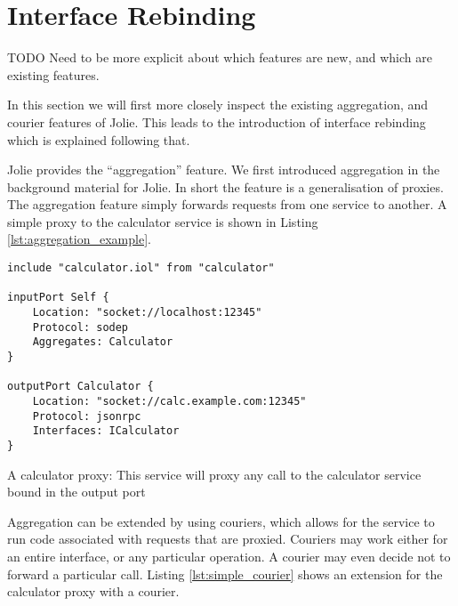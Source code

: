 \section{Interface Rebinding}
\label{sec:interface_rebinding}

TODO Need to be more explicit about which features are new, and which are
existing features.

In this section we will first more closely inspect the existing aggregation,
   and courier features of Jolie. This leads to the introduction of interface
   rebinding which is explained following that.

Jolie provides the ``aggregation'' feature. We first introduced aggregation in
the background material for Jolie. In short the feature is a generalisation of
proxies. The aggregation feature simply forwards requests from one service to
another. A simple proxy to the calculator service is shown in Listing
\ref{lst:aggregation_example}.

\begin{listing}[H]
\begin{verbatim}
include "calculator.iol" from "calculator"

inputPort Self {
    Location: "socket://localhost:12345"
    Protocol: sodep
    Aggregates: Calculator
}

outputPort Calculator {
    Location: "socket://calc.example.com:12345"
    Protocol: jsonrpc
    Interfaces: ICalculator
}
\end{verbatim}

\caption{A calculator proxy: This service will proxy any call to the calculator
    service bound in the output port }

\label{lst:aggregation_example}

\end{listing}

Aggregation can be extended by using couriers, which allows for the service to
run code associated with requests that are proxied. Couriers may work either
for an entire interface, or any particular operation. A courier may even
decide not to forward a particular call. Listing \ref{lst:simple_courier} shows
an extension for the calculator proxy with a courier.

